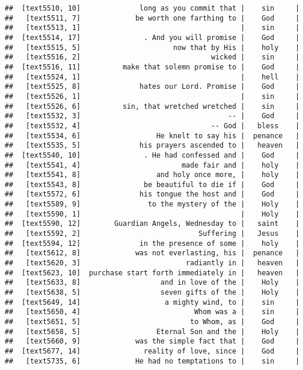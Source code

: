 \documentclass[]{article}
\begin{document}
\begin{verbatim}
##  [text5510, 10]              long as you commit that |    sin     |
##   [text5511, 7]             be worth one farthing to |    God     |
##   [text5513, 1]                                      |    sin     |
##  [text5514, 17]               . And you will promise |    God     |
##   [text5515, 5]                      now that by His |    holy    |
##   [text5516, 2]                               wicked |    sin     |
##  [text5516, 11]          make that solemn promise to |    God     |
##   [text5524, 1]                                      |    hell    |
##   [text5525, 8]              hates our Lord. Promise |    God     |
##   [text5526, 1]                                      |    sin     |
##   [text5526, 6]          sin, that wretched wretched |    sin     |
##   [text5532, 3]                                   -- |    God     |
##   [text5532, 4]                               -- God |   bless    |
##   [text5534, 6]                  He knelt to say his |  penance   |
##   [text5535, 5]              his prayers ascended to |   heaven   |
##  [text5540, 10]               . He had confessed and |    God     |
##   [text5541, 4]                        made fair and |    holy    |
##   [text5541, 8]                  and holy once more, |    holy    |
##   [text5543, 8]               be beautiful to die if |    God     |
##   [text5572, 6]              his tongue the host and |    God     |
##   [text5589, 9]                to the mystery of the |    Holy    |
##   [text5590, 1]                                      |    Holy    |
##  [text5590, 12]        Guardian Angels, Wednesday to |   saint    |
##   [text5592, 2]                            Suffering |   Jesus    |
##  [text5594, 12]              in the presence of some |    holy    |
##   [text5612, 8]             was not everlasting, his |  penance   |
##   [text5620, 3]                         radiantly in |   heaven   |
##  [text5623, 10]  purchase start forth immediately in |   heaven   |
##   [text5633, 8]                   and in love of the |    Holy    |
##   [text5638, 5]                   seven gifts of the |    Holy    |
##  [text5649, 14]                    a mighty wind, to |    sin     |
##   [text5650, 4]                           Whom was a |    sin     |
##   [text5651, 5]                          to Whom, as |    God     |
##   [text5658, 5]                  Eternal Son and the |    Holy    |
##   [text5660, 9]             was the simple fact that |    God     |
##  [text5677, 14]               reality of love, since |    God     |
##   [text5735, 6]             He had no temptations to |    sin     |

\end{verbatim}
\end{document}
